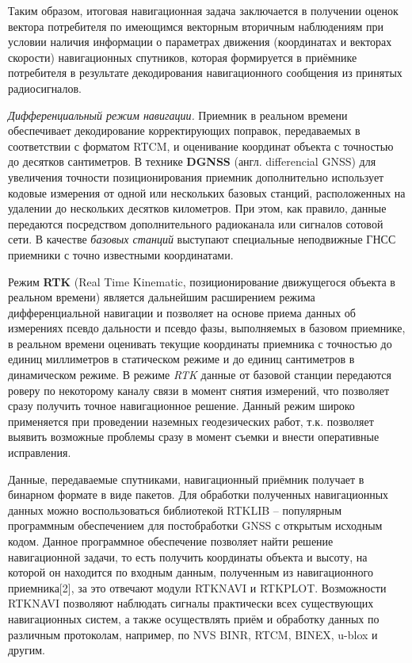 Таким образом, итоговая навигационная задача заключается в получении оценок вектора потребителя по имеющимся векторным вторичным наблюдениям при условии наличия информации о параметрах движения (координатах и векторах скорости) навигационных спутников, которая формируется в приёмнике потребителя в результате декодирования навигационного сообщения из принятых радиосигналов.

\textit{Дифференциальный режим навигации.} Приемник в реальном времени
обеспечивает декодирование корректирующих поправок, передаваемых в 
соответствии с форматом RTCM, и оценивание координат объекта с
точностью до десятков сантиметров. В технике \textbf{DGNSS} (англ. differencial GNSS) для увеличения точности позиционирования приемник дополнительно использует кодовые измерения от одной или нескольких базовых станций, расположенных на удалении до нескольких десятков километров.
При этом, как правило, данные передаются посредством дополнительного радиоканала или сигналов сотовой сети. 
В качестве \textit{базовых станций} выступают специальные неподвижные ГНСС приемники с точно известными координатами\cite{perov10glonass}.

Режим \textbf{RTK} (Real Time Kinematic, позиционирование движущегося объекта в реальном времени) является дальнейшим расширением режима дифференциальной навигации и позволяет на основе приема данных об измерениях псевдо дальности и псевдо фазы, выполняемых в базовом приемнике, в реальном времени оценивать текущие координаты приемника с точностью до единиц миллиметров в статическом режиме и до единиц сантиметров в динамическом режиме. В режиме \textit{RTK} данные от базовой станции передаются роверу по некоторому каналу связи в момент снятия измерений, что позволяет сразу получить точное навигационное решение.
Данный режим широко применяется при проведении наземных геодезических работ, т.к. позволяет выявить возможные проблемы сразу в момент съемки и внести оперативные исправления. 

Данные, передаваемые спутниками, навигационный приёмник получает в бинарном формате в виде пакетов. Для обработки полученных навигационных данных можно воспользоваться библиотекой RTKLIB – популярным программным обеспечением для постобработки GNSS с открытым исходным кодом. Данное программное обеспечение позволяет найти
решение навигационной задачи, то есть получить координаты объекта и высоту,
на которой он находится по входным данным, полученным из навигационного
приемника[2], за это отвечают модули RTKNAVI и RTKPLOT. Возможности
RTKNAVI позволяют наблюдать сигналы практически всех существующих навигационных
систем, а также осуществлять приём и обработку данных по различным протоколам, например, по NVS BINR, RTCM, BINEX, u-blox и другим.